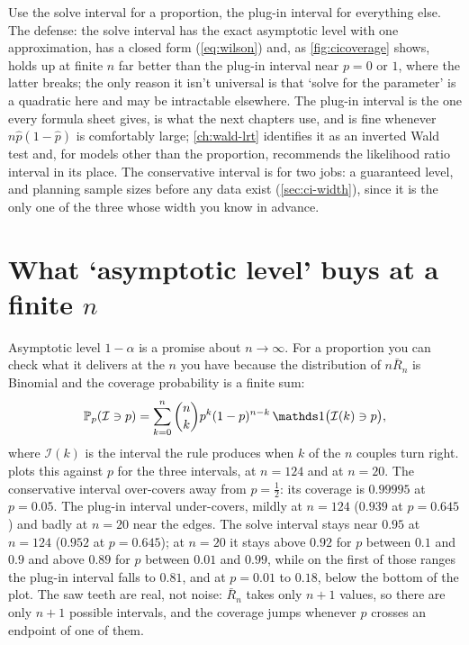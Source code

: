 \begin{intuition}
Use the solve interval for a proportion, the plug-in interval for everything else.
The defense: the solve interval has the exact asymptotic level with one approximation, has a closed form (\cref{eq:wilson}) and, as \cref{fig:cicoverage} shows, holds up at finite $n$ far better than the plug-in interval near $p = 0$ or $1$, where the latter breaks; the only reason it isn't universal is that `solve for the parameter' is a quadratic here and may be intractable elsewhere.
The plug-in interval is the one every formula sheet gives, is what the next chapters use, and is fine whenever $n\hat{p}(1-\hat{p})$ is comfortably large; \cref{ch:wald-lrt} identifies it as an inverted Wald test and, for models other than the proportion, recommends the likelihood ratio interval in its place.
The conservative interval is for two jobs: a guaranteed level, and planning sample sizes before any data exist (\cref{sec:ci-width}), since it is the only one of the three whose width you know in advance.
\end{intuition}

\section{What `asymptotic level' buys at a finite \texorpdfstring{$n$}{n}}
\label{sec:ci-coverage}

Asymptotic level $1 - \alpha$ is a promise about $n \to \infty$.
For a proportion you can check what it delivers at the $n$ you have because the distribution of $n\bar{R}_n$ is Binomial and the coverage probability is a finite sum:
\[
\Pr_p(\mathcal{I} \ni p) = \sum_{k=0}^{n} \binom{n}{k} p^k (1-p)^{n-k} \, \ind\big( \mathcal{I}(k) \ni p \big),
\]
where $\mathcal{I}(k)$ is the interval the rule produces when $k$ of the $n$ couples turn right.
 plots this against $p$ for the three intervals, at $n = 124$ and at $n = 20$.
The conservative interval over-covers away from $p = \frac12$: its coverage is $0.99995$ at $p = 0.05$.
The plug-in interval under-covers, mildly at $n = 124$ ($0.939$ at $p = 0.645$) and badly at $n = 20$ near the edges.
The solve interval stays near $0.95$ at $n = 124$ ($0.952$ at $p = 0.645$); at $n = 20$ it stays above $0.92$ for $p$ between $0.1$ and $0.9$ and above $0.89$ for $p$ between $0.01$ and $0.99$, while on the first of those ranges the plug-in interval falls to $0.81$, and at $p = 0.01$ to $0.18$, below the bottom of the plot.
The saw teeth are real, not noise: $\bar{R}_n$ takes only $n + 1$ values, so there are only $n + 1$ possible intervals, and the coverage jumps whenever $p$ crosses an endpoint of one of them.

